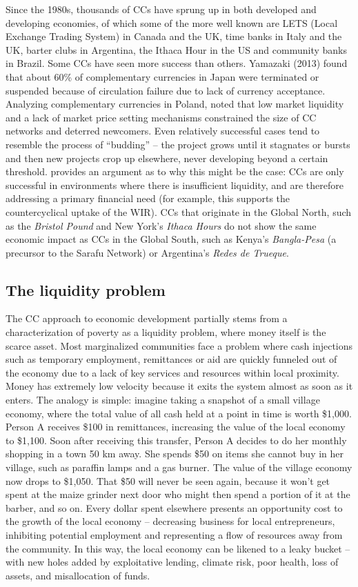 \documentclass[12pt]{article}
\begin{document}
Since the 1980s, thousands of CCs have sprung up in both developed and developing economies, of which some of the more well known are LETS (Local Exchange Trading System) in Canada and the UK, time banks in Italy and the UK, barter clubs in Argentina, the Ithaca Hour in the US and community banks in Brazil. Some CCs have seen more success than others. Yamazaki (2013) found that about 60\% of complementary currencies in Japan were terminated or suspended because of circulation failure due to lack of currency acceptance. Analyzing complementary currencies in Poland, \cite{=Sobiecki2018Sustainability} noted that low market liquidity and a lack of market price setting mechanisms constrained the size of CC networks and deterred newcomers. Even relatively successful cases tend to resemble the process of “budding” – the project grows until it stagnates or bursts and then new projects crop up elsewhere, never developing beyond a certain threshold. \cite{zeller2019} provides an argument as to why this might be the case: CCs are only successful in environments where there is insufficient liquidity, and are therefore addressing a primary financial need (for example, this supports the countercyclical uptake of the WIR). CCs that originate in the Global North, such as the \textit{Bristol Pound} and New York’s \textit{Ithaca Hours} do not show the same economic impact as CCs in the Global South, such as Kenya’s \textit{Bangla-Pesa} (a precursor to the Sarafu Network) or Argentina’s \textit{Redes de Trueque}.

\subsection{The liquidity problem}
The CC approach to economic development partially stems from a characterization of poverty as a liquidity problem, where money itself is the scarce asset. Most marginalized communities face a problem where cash injections such as temporary employment, remittances or aid are quickly funneled out of the economy due to a lack of key services and resources within local proximity. Money has extremely low velocity because it exits the system almost as soon as it enters. The analogy is simple: imagine taking a snapshot of a small village economy, where the total value of all cash held at a point in time is worth \$1,000. Person A receives \$100 in remittances, increasing the value of the local economy to \$1,100. Soon after receiving this transfer, Person A decides to do her monthly shopping in a town 50 km away. She spends \$50 on items she cannot buy in her village, such as paraffin lamps and a gas burner. The value of the village economy now drops to \$1,050. That \$50 will never be seen again, because it won’t get spent at the maize grinder next door who might then spend a portion of it at the barber, and so on. Every dollar spent elsewhere presents an opportunity cost to the growth of the local economy – decreasing business for local entrepreneurs, inhibiting potential employment and representing a flow of resources away from the community. In this way, the local economy can be likened to a leaky bucket – with new holes added by exploitative lending, climate risk, poor health, loss of assets, and misallocation of funds.
\end{document}
